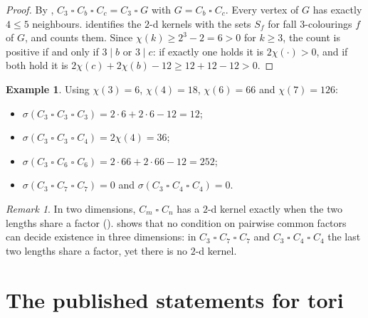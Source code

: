 \documentclass[11pt]{article}
\theoremstyle{plain}
\theoremstyle{definition}
\newtheorem{example}[example]{Example}
\theoremstyle{remark}
\newtheorem{remark}[remark]{Remark}
\newcommand{\T}{\mathbin{\square}}
\begin{document}
\begin{proof}
By , $C_3 \T C_b \T C_c = C_3 \T G$ with $G = C_b \T C_c$. Every vertex of
$G$ has exactly $4 \le 5$ neighbours.  identifies the $2$-d kernels with
the sets $S_f$ for fall $3$-colourings $f$ of $G$, and  counts them.
Since $\chi(k) \ge 2^3 - 2 = 6 > 0$ for $k \ge 3$, the count is positive if and only if
$3 \mid b$ or $3 \mid c$: if exactly one holds it is $2\chi(\cdot) > 0$, and if both hold it
is $2\chi(c) + 2\chi(b) - 12 \ge 12 + 12 - 12 > 0$.
\end{proof}

\begin{example}\label{ex:3d}
Using $\chi(3) = 6$, $\chi(4) = 18$, $\chi(6) = 66$ and $\chi(7) = 126$:
\begin{itemize}
  \item $\sigma(C_3 \T C_3 \T C_3) = 2 \cdot 6 + 2 \cdot 6 - 12 = 12$;
  \item $\sigma(C_3 \T C_3 \T C_4) = 2\chi(4) = 36$;
  \item $\sigma(C_3 \T C_6 \T C_6) = 2 \cdot 66 + 2 \cdot 66 - 12 = 252$;
  \item $\sigma(C_3 \T C_7 \T C_7) = 0$ and $\sigma(C_3 \T C_4 \T C_4) = 0$.
\end{itemize}
\end{example}

\begin{remark}
In two dimensions, $C_m \T C_n$ has a $2$-d kernel exactly when the two lengths share a
factor ().  shows that no condition on pairwise common factors
can decide existence in three dimensions: in $C_3 \T C_7 \T C_7$ and $C_3 \T C_4 \T C_4$ the
last two lengths share a factor, yet there is no $2$-d kernel.
\end{remark}

\section{The published statements for tori}\label{sec:literature}
\end{document}

